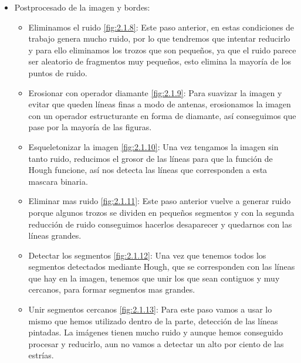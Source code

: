 \begin{itemize}
\item Postprocesado de la imagen y bordes:
	\begin{itemize}
		\item Eliminamos el ruido \ref{fig:2.1.8}:
Este paso anterior, en estas condiciones de trabajo genera mucho ruido, por lo que tendremos que intentar reducirlo y para ello eliminamos los trozos que son pequeños, ya que el ruido parece ser aleatorio de fragmentos muy pequeños, esto elimina la mayoría de los puntos de ruido.
		\item Erosionar con operador diamante \ref{fig:2.1.9}:
Para suavizar la imagen y evitar que queden líneas finas a modo de antenas, erosionamos la imagen con un operador estructurante en forma de diamante, así conseguimos que pase por la mayoría de las figuras.
		\item Esqueletonizar la imagen \ref{fig:2.1.10}:
Una vez tengamos la imagen sin tanto ruido, reducimos el grosor de las líneas para que la función de Hough funcione, así nos detecta las líneas que corresponden a esta mascara binaria.
		\item Eliminar mas ruido \ref{fig:2.1.11}:
Este paso anterior vuelve a generar ruido porque algunos trozos se dividen en pequeños segmentos y con la segunda reducción de ruido conseguimos hacerlos desaparecer y quedarnos con las líneas grandes.
		\item Detectar los segmentos \ref{fig:2.1.12}:
Una vez que tenemos todos los segmentos detectados mediante Hough, que se corresponden con las líneas que hay en la imagen, tenemos que unir los que sean contiguos y muy cercanos, para formar segmentos mas grandes.
		\item Unir segmentos cercanos \ref{fig:2.1.13}:
Para este paso vamos a usar lo mismo que hemos utilizado dentro de la parte, detección de las líneas pintadas.
La imágenes tienen mucho ruido y aunque hemos conseguido procesar y reducirlo, aun no vamos a detectar un alto por ciento de las estrías.
	\end{itemize}

\end{itemize}



